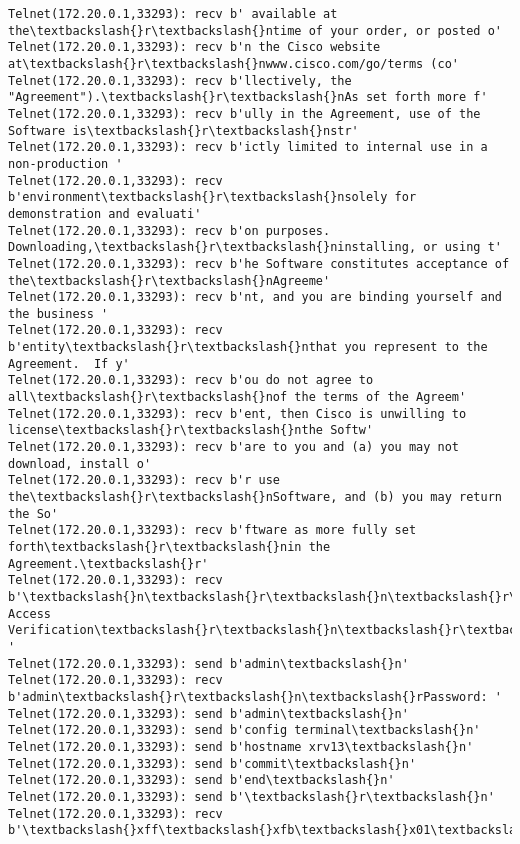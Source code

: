\documentclass[11pt]{article}
\begin{document}
\begin{Verbatim}[commandchars=\\\{\}]
Telnet(172.20.0.1,33293): recv b' available at the\textbackslash{}r\textbackslash{}ntime of your order, or posted o'
Telnet(172.20.0.1,33293): recv b'n the Cisco website at\textbackslash{}r\textbackslash{}nwww.cisco.com/go/terms (co'
Telnet(172.20.0.1,33293): recv b'llectively, the "Agreement").\textbackslash{}r\textbackslash{}nAs set forth more f'
Telnet(172.20.0.1,33293): recv b'ully in the Agreement, use of the Software is\textbackslash{}r\textbackslash{}nstr'
Telnet(172.20.0.1,33293): recv b'ictly limited to internal use in a non-production '
Telnet(172.20.0.1,33293): recv b'environment\textbackslash{}r\textbackslash{}nsolely for demonstration and evaluati'
Telnet(172.20.0.1,33293): recv b'on purposes.  Downloading,\textbackslash{}r\textbackslash{}ninstalling, or using t'
Telnet(172.20.0.1,33293): recv b'he Software constitutes acceptance of the\textbackslash{}r\textbackslash{}nAgreeme'
Telnet(172.20.0.1,33293): recv b'nt, and you are binding yourself and the business '
Telnet(172.20.0.1,33293): recv b'entity\textbackslash{}r\textbackslash{}nthat you represent to the Agreement.  If y'
Telnet(172.20.0.1,33293): recv b'ou do not agree to all\textbackslash{}r\textbackslash{}nof the terms of the Agreem'
Telnet(172.20.0.1,33293): recv b'ent, then Cisco is unwilling to license\textbackslash{}r\textbackslash{}nthe Softw'
Telnet(172.20.0.1,33293): recv b'are to you and (a) you may not download, install o'
Telnet(172.20.0.1,33293): recv b'r use the\textbackslash{}r\textbackslash{}nSoftware, and (b) you may return the So'
Telnet(172.20.0.1,33293): recv b'ftware as more fully set forth\textbackslash{}r\textbackslash{}nin the Agreement.\textbackslash{}r'
Telnet(172.20.0.1,33293): recv b'\textbackslash{}n\textbackslash{}r\textbackslash{}n\textbackslash{}r\textbackslash{}nUser Access Verification\textbackslash{}r\textbackslash{}n\textbackslash{}r\textbackslash{}nUsername: '
Telnet(172.20.0.1,33293): send b'admin\textbackslash{}n'
Telnet(172.20.0.1,33293): recv b'admin\textbackslash{}r\textbackslash{}n\textbackslash{}rPassword: '
Telnet(172.20.0.1,33293): send b'admin\textbackslash{}n'
Telnet(172.20.0.1,33293): send b'config terminal\textbackslash{}n'
Telnet(172.20.0.1,33293): send b'hostname xrv13\textbackslash{}n'
Telnet(172.20.0.1,33293): send b'commit\textbackslash{}n'
Telnet(172.20.0.1,33293): send b'end\textbackslash{}n'
Telnet(172.20.0.1,33293): send b'\textbackslash{}r\textbackslash{}n'
Telnet(172.20.0.1,33293): recv b'\textbackslash{}xff\textbackslash{}xfb\textbackslash{}x01\textbackslash{}xff\textbackslash{}xfb\textbackslash{}x03\textbackslash{}xff\textbackslash{}xfb\textbackslash{}x00\textbackslash{}xff\textbackslash{}xfd\textbackslash{}x00\textbackslash{}x1b]0;xrv13\textbackslash{}x07\textbackslash{}r\textbackslash{}n\textbackslash{}rRP/0/0/CPU0:xrv13\#\textbackslash{}r\textbackslash{}n\textbackslash{}rRP/0'

\end{Verbatim}
\end{document}
